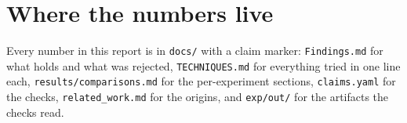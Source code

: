 \documentclass[11pt,a4paper]{article}
\begin{document}
\section{Where the numbers live}

Every number in this report is in \texttt{docs/} with a claim marker:
\texttt{Findings.md} for what holds and what was rejected, \texttt{TECHNIQUES.md}
for everything tried in one line each, \texttt{results/comparisons.md} for the
per-experiment sections, \texttt{claims.yaml} for the checks, \texttt{related\_work.md}
for the origins, and \texttt{exp/out/} for the artifacts the checks read.
\end{document}
